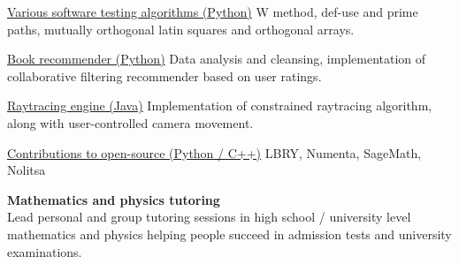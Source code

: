 \documentclass[9pt]{developercv} %
\begin{document}
\begin{entrylist}
	\entry
		{}
		{\href{https://github.com/mirgee/w_method}{Various software testing algorithms (Python)}}
		{}
		{W method, def-use and prime paths, mutually orthogonal latin squares and orthogonal arrays.
        }

	\entry
		{}
		{\href{https://github.com/mirgee/book_recommender}{Book recommender (Python)}}
		{}
		{Data analysis and cleansing, implementation of collaborative filtering recommender based on user ratings.
        }

	\entry
		{}
		{\href{https://github.com/mirgee/raytracing_engine}{Raytracing engine (Java)}}
		{}
		{Implementation of constrained raytracing algorithm, along with user-controlled camera movement.
        }

	\entry
		{}
		{\href{}{Contributions to open-source (Python / C++)}}
		{}
		{LBRY, Numenta, SageMath, Nolitsa
        }
\end{entrylist}



\textbf{Mathematics and physics tutoring}\\Lead personal and group tutoring sessions in high school / university level mathematics and physics helping people succeed in admission tests and university examinations.
\end{document}
